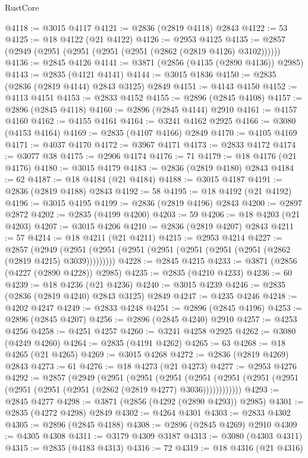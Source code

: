 \begin{lexlean}{RustCore}
\begin{coremodule}
@4118 := @3015 @4117
@4121 := @2836 (@2819 @4118) @2843
@4122 := 53
@4125 := @18 @4122 (@21 @4122)
@4126 := @2953 @4125
@4135 := @2857 (@2949 (@2951 (@2951 (@2951 (@2951 (@2862 (@2819 @4126) @3102))))))
@4136 := @2845 @4126
@4141 := @3871 (@2856 (@4135 (@2890 @4136)) @2985)
@4143 := @2835 (@4121 @4141)
@4144 := @3015 @1836
@4150 := @2835 (@2836 (@2819 @4144) @2843 @3125) @2849
@4151 := @4143 @4150
@4152 := @4113 @4151
@4153 := @2833 @4152
@4155 := @2896 (@2845 @4108)
@4157 := @2896 (@2845 @4118)
@4160 := @2896 (@2845 @4144) @2910
@4161 := @4157 @4160
@4162 := @4155 @4161
@4164 := @3241 @4162 @2925
@4166 := @3080 (@4153 @4164)
@4169 := @2835 (@4107 @4166) @2849
@4170 := @4105 @4169
@4171 := @4037 @4170
@4172 := @3967 @4171
@4173 := @2833 @4172
@4174 := @3077 @38
@4175 := @2906 @4174
@4176 := 71
@4179 := @18 @4176 (@21 @4176)
@4180 := @3015 @4179
@4183 := @2836 (@2819 @4180) @2843
@4184 := 62
@4187 := @18 @4184 (@21 @4184)
@4188 := @3015 @4187
@4191 := @2836 (@2819 @4188) @2843
@4192 := 58
@4195 := @18 @4192 (@21 @4192)
@4196 := @3015 @4195
@4199 := @2836 (@2819 @4196) @2843
@4200 := @2897 @2872
@4202 := @2835 (@4199 @4200)
@4203 := 59
@4206 := @18 @4203 (@21 @4203)
@4207 := @3015 @4206
@4210 := @2836 (@2819 @4207) @2843
@4211 := 57
@4214 := @18 @4211 (@21 @4211)
@4215 := @2953 @4214
@4227 := @2857
    (@2949 (@2951 (@2951 (@2951 (@2951 (@2951 (@2951 (@2951 (@2862 (@2819 @4215) @3039)))))))))
@4228 := @2845 @4215
@4233 := @3871 (@2856 (@4227 (@2890 @4228)) @2985)
@4235 := @2835 (@4210 @4233)
@4236 := 60
@4239 := @18 @4236 (@21 @4236)
@4240 := @3015 @4239
@4246 := @2835 (@2836 (@2819 @4240) @2843 @3125) @2849
@4247 := @4235 @4246
@4248 := @4202 @4247
@4249 := @2833 @4248
@4251 := @2896 (@2845 @4196)
@4253 := @2896 (@2845 @4207)
@4256 := @2896 (@2845 @4240) @2910
@4257 := @4253 @4256
@4258 := @4251 @4257
@4260 := @3241 @4258 @2925
@4262 := @3080 (@4249 @4260)
@4264 := @2835 (@4191 @4262)
@4265 := 63
@4268 := @18 @4265 (@21 @4265)
@4269 := @3015 @4268
@4272 := @2836 (@2819 @4269) @2843
@4273 := 61
@4276 := @18 @4273 (@21 @4273)
@4277 := @2953 @4276
@4292 := @2857
    (@2949
      (@2951
        (@2951
          (@2951
            (@2951 (@2951 (@2951 (@2951 (@2951 (@2951 (@2951 (@2862 (@2819 @4277) @3036))))))))))))
@4293 := @2845 @4277
@4298 := @3871 (@2856 (@4292 (@2890 @4293)) @2985)
@4301 := @2835 (@4272 @4298) @2849
@4302 := @4264 @4301
@4303 := @2833 @4302
@4305 := @2896 (@2845 @4188)
@4308 := @2896 (@2845 @4269) @2910
@4309 := @4305 @4308
@4311 := @3179 @4309 @3187
@4313 := @3080 (@4303 @4311)
@4315 := @2835 (@4183 @4313)
@4316 := 72
@4319 := @18 @4316 (@21 @4316)

\end{coremodule}
\end{lexlean}

